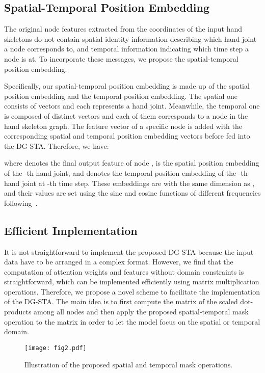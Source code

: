 \documentclass{bmvc2k}
\begin{document}
\subsection{Spatial-Temporal Position Embedding}
\label{sec:pos_embedding}



The original node features  extracted from the coordinates of the input hand skeletons do not contain spatial identity information describing which hand joint a node corresponds to, and temporal information indicating which time step a node is at. To incorporate these messages, we propose the spatial-temporal position embedding.

Specifically, our spatial-temporal position embedding is made up of  the spatial position embedding and the temporal position embedding. The spatial one consists of  vectors and each  represents a hand joint. Meanwhile, the temporal one is composed of  distinct vectors and each of them corresponds to a node in the hand skeleton graph. The feature vector of a specific node is added with the corresponding spatial and temporal position embedding vectors before fed into the DG-STA. Therefore, we have: 

where  denotes the final output feature of node ,  is the spatial position embedding of the -th hand joint, and  denotes the temporal position embedding of the -th hand joint at -th time step. These embeddings are with the same dimension as , and their values are set using the sine and cosine functions of different frequencies following~\cite{vaswani2017attention}.

\subsection{Efficient Implementation}
\label{sec:efficient_imp}

 It is not straightforward to implement the proposed DG-STA because the input data have to be arranged in a complex format. However, we find that the computation of attention weights and features without domain constraints is straightforward, which can be implemented efficiently using matrix multiplication operations. Therefore, we propose a novel scheme to facilitate the implementation of the DG-STA. The main idea is to first compute the matrix of the scaled dot-products among all nodes and then apply the proposed spatial-temporal mask operation to the matrix in order to let the model focus on the spatial or temporal domain. 
 
\begin{figure}[h]
\texttt{[image: fig2.pdf]}
\caption{Illustration of the proposed spatial and temporal mask operations.}
\label{fig:mask_op}
\end{figure}
 
\end{document}
